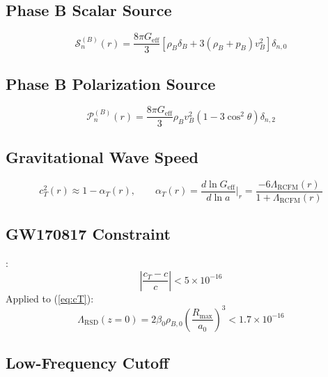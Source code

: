 \documentclass[10pt,twocolumn]{article}
\theoremstyle{definition}
\newcommand{\Rmax}{R_{\max}}
\newcommand{\rhoB}{\rho_{B}}
\newcommand{\Geff}{G_{\mathrm{eff}}}
\begin{document}
\subsection{Phase B Scalar Source}


\begin{equation}
  \mathcal{S}_{n}^{(B)}(r)
    = \frac{8\pi\Geff}{3}
      \left[\rhoB\delta_{B}
            + 3(\rhoB + p_{B})v_{B}^{2}\right]
      \delta_{n,0}
  \label{eq:S_B}
\end{equation}


\subsection{Phase B Polarization Source}


\begin{equation}
  \mathcal{P}_{n}^{(B)}(r)
    = \frac{8\pi\Geff}{3}
      \rhoB v_{B}^{2}
      \left(1-3\cos^{2}\theta\right)
      \delta_{n,2}
  \label{eq:P-B}
\end{equation}


\subsection{Gravitational Wave Speed}

\begin{equation}
  c_{T}^{2}(r)
    \approx 1-\alpha_{T}(r),
  \qquad
  \alpha_{T}(r)
    = \frac{d\ln\Geff}{d\ln a}\bigg|_{r}
    = \frac{-6\Lambda_{\mathrm{RCFM}}(r)}
           {1+\Lambda_{\mathrm{RCFM}}(r)}
  \label{eq:cT}
\end{equation}

\subsection{GW170817 Constraint}

\citep{Abbott2017GW}:
\begin{equation}
  \left|\frac{c_{T}-c}{c}\right| < 5\times10^{-16}
\end{equation}
Applied to (\ref{eq:cT}):
\begin{equation}
  \Lambda_{\mathrm{RSD}}(z=0)
    = 2\beta_{0}\rho_{B,0}\left(\frac{\Rmax}{a_{0}}\right)^{3}
    < 1.7\times10^{-16}
  \label{eq:GW-constraint}
\end{equation}


\subsection{Low-Frequency Cutoff}
\end{document}
